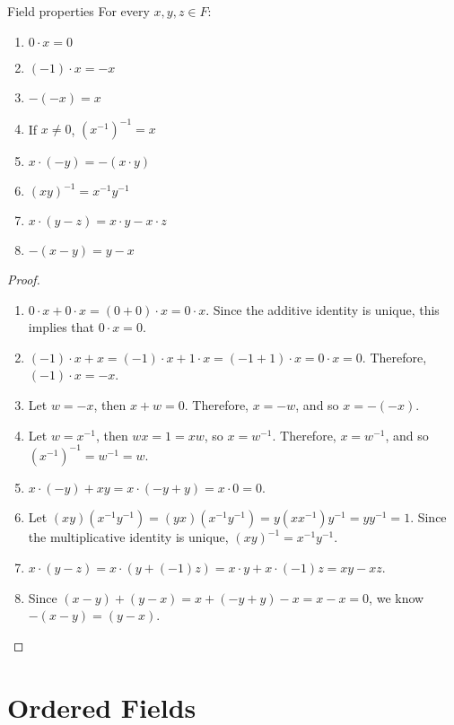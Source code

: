 \documentclass[12pt]{article}
\begin{document}
\begin{thm}{Field properties}\label{field-properties}\proofbreak
    For every $x, y, z \in F$:
    \begin{enumerate}
        \item $0 \cdot x = 0$
        \item $(-1) \cdot x = -x$
        \item $-(-x) = x$
        \item If $x \neq 0$, $\left(x^{-1}\right)^{-1} = x$
        \item $x \cdot (-y) = -(x\cdot y)$
        \item $(xy)^{-1} = x^{-1}y^{-1}$
        \item $x\cdot(y-z) = x\cdot y - x \cdot z$
        \item $-(x - y) = y - x$
    \end{enumerate}
\end{thm}

\begin{proof}\proofbreak
    \begin{enumerate}
        \item $0 \cdot x + 0 \cdot x = (0 + 0) \cdot x = 0 \cdot x$. Since the additive identity is unique, this implies that $0 \cdot x = 0$.
        \item $(-1) \cdot x + x = (-1) \cdot x + 1 \cdot x = (-1 + 1) \cdot x = 0 \cdot x = 0$. Therefore, $(-1) \cdot x = -x$.
        \item Let $w = -x$, then $x + w = 0$. Therefore, $x = -w$, and so $x = -(-x)$.
        \item Let $w = x^{-1}$, then $wx = 1 = xw$, so $x = w^{-1}$. Therefore, $x = w^{-1}$, and so $(x^{-1})^{-1} = w^{-1} = w$.
        \item $x \cdot (-y) + xy = x\cdot(-y + y) = x\cdot 0 = 0$.
        \item Let $(xy)(x^{-1}y^{-1}) = (yx)(x^{-1}y^{-1}) = y(xx^{-1})y^{-1} = yy^{-1} = 1$. Since the multiplicative identity is unique, $(xy)^{-1} = x^{-1}y^{-1}$.
        \item $x \cdot (y-z) = x \cdot (y + (-1)z) = x\cdot y + x \cdot (-1)z = xy - xz$.
        \item Since $(x - y) + (y-x) = x + (-y + y) - x = x - x = 0$, we know $-(x - y) = (y - x)$.
    \end{enumerate}
\end{proof}

\section{Ordered Fields}
\end{document}

